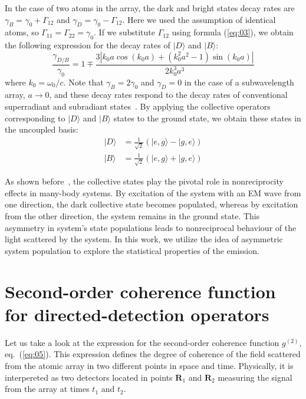 \documentclass[aps,prl,twocolumn,superscriptaddress,showpacs,amsmath,amssymb]{revtex4-2}
\begin{document}
In the case of two atoms in the array, the dark and bright states decay rates are $\gamma_{B} = \gamma_0 + \Gamma_{12}$ and $\gamma_{D} = \gamma_0 - \Gamma_{12}$. 
Here we used the assumption of identical atoms, so $\Gamma_{11} = \Gamma_{22} = \gamma_0$. 
If we substitute $\Gamma_{12}$ using formula (\ref{eq:03}), we obtain the following expression for the decay rates of $|D\rangle$ and $|B \rangle$:
\begin{equation}
\frac{\gamma_{D/B}}{\gamma_0} = 1 \mp \frac{3 \left| k_0 a \cos \left( k_0 a \right)+ \left(k_0^2 a^2 -1\right)\sin \left( k_0 a \right)\right| }{2 k_0^3 a^3}
    \label{eq:11}
\end{equation}
where $k_0 = \omega_0 / c$.
Note that $\gamma_B = 2 \gamma_0$ and $\gamma_D = 0$ in the case of a subwavelength array, $a \to 0$, and these decay rates respond to the decay rates of conventional superradiant and subradiant states~\cite{dicke1954coherence,nefedkin2017bad,nefedkin2017superradiance}.
By applying the collective operators corresponding to $|D\rangle$ and $|B \rangle$ states to the ground state, we obtain these states in the uncoupled basis:
\begin{align}
    |D \rangle &= \frac{1}{\sqrt{2}} \left( |e,g\rangle - |g,e\rangle \right)\\
    |B \rangle &= \frac{1}{\sqrt{2}} \left( |e,g\rangle + |g,e\rangle \right)
\end{align}

As shown before~\cite{muller2017nonreciprocal,hamann2018nonreciprocity, nefedkin2022dark, nefedkin2023nonreciprocal}, the collective states play the pivotal role in nonreciprocity effects in many-body systems. 
By excitation of the system with an EM wave from one direction, the dark collective state becomes populated, whereas by excitation from the other direction, the system remains in the ground state. 
This asymmetry in system's state populations leads to nonreciprocal behaviour of the light scattered by the system. 
In this work, we utilize the idea of asymmetric system population to explore the statistical properties of the emission.

\section{Second-order coherence function for directed-detection operators}

Let us take a look at the expression for the second-order coherence function $g^{(2)}$, eq.~(\ref{eq:05}).
This expression defines the degree of coherence of the field scattered from the atomic array in two different points in space and time.
Physically, it is interpereted as two detectors located in points $\mathbf{R}_1$ and $\mathbf{R}_2$ measuring the signal from the array at times $t_1$ and $t_2$.
\end{document}
